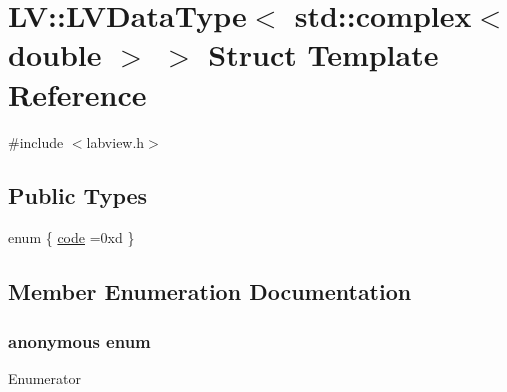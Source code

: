 \hypertarget{struct_l_v_1_1_l_v_data_type_3_01std_1_1complex_3_01double_01_4_01_4}{}\section{LV\+:\+:L\+V\+Data\+Type$<$ std\+:\+:complex$<$ double $>$ $>$ Struct Template Reference}
\label{struct_l_v_1_1_l_v_data_type_3_01std_1_1complex_3_01double_01_4_01_4}


{\ttfamily \#include $<$labview.\+h$>$}

\subsection*{Public Types}
\begin{DoxyCompactItemize}
\item 
enum \{ \hyperlink{struct_l_v_1_1_l_v_data_type_3_01std_1_1complex_3_01double_01_4_01_4_a5d1e77d83362a491e20731b4ad47c2f6a443567c038be617a340a2ebf5baa864d}{code} =0xd
 \}
\end{DoxyCompactItemize}


\subsection{Member Enumeration Documentation}
\subsubsection[{\texorpdfstring{anonymous enum}{anonymous enum}}]{\setlength{\rightskip}{0pt plus 5cm}anonymous enum}\hypertarget{struct_l_v_1_1_l_v_data_type_3_01std_1_1complex_3_01double_01_4_01_4_a5d1e77d83362a491e20731b4ad47c2f6}{}\label{struct_l_v_1_1_l_v_data_type_3_01std_1_1complex_3_01double_01_4_01_4_a5d1e77d83362a491e20731b4ad47c2f6}
\begin{Desc}
\item[Enumerator]\par
\begin{description}
\item[{\em 
code\hypertarget{struct_l_v_1_1_l_v_data_type_3_01std_1_1complex_3_01double_01_4_01_4_a5d1e77d83362a491e20731b4ad47c2f6a443567c038be617a340a2ebf5baa864d}{}\label{struct_l_v_1_1_l_v_data_type_3_01std_1_1complex_3_01double_01_4_01_4_a5d1e77d83362a491e20731b4ad47c2f6a443567c038be617a340a2ebf5baa864d}
}]\end{description}
\end{Desc}

